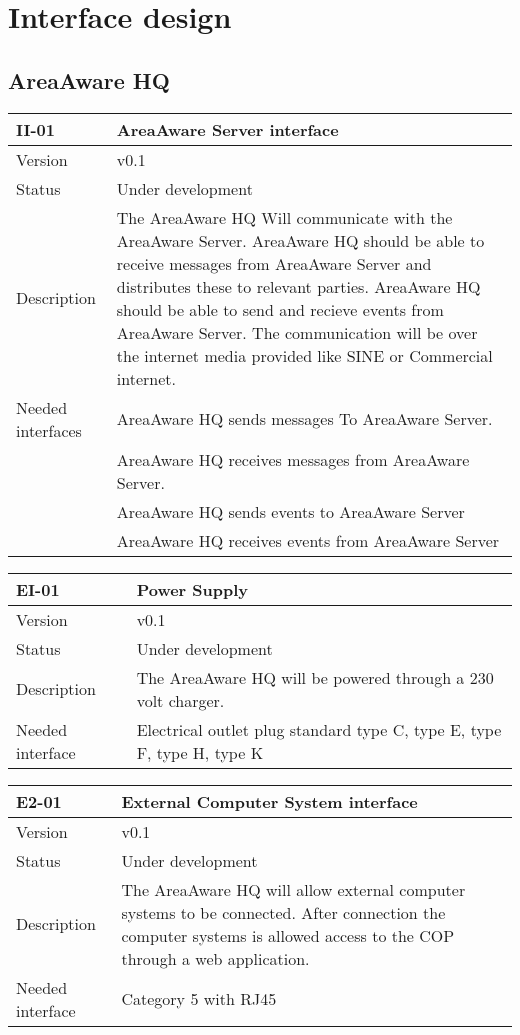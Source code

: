 \chapter{Interface design}
\label{chp_interfaceDesign}

\section{AreaAware HQ}
\label{sec:areaAwarehq}

\begin{longtable}{| p{3.5cm} |  p{10cm} | }
	\hline
	\textbf{II-01} &  \textbf{AreaAware Server interface } \\
	\hline
	Version & v0.1 \\
	\hline
	Status & Under development \\
	\hline
	 Description & The AreaAware HQ Will communicate with the AreaAware Server. AreaAware HQ should be able to receive messages from AreaAware Server and distributes these to relevant parties. AreaAware HQ should be able to send and recieve events from AreaAware Server. The communication will be over the internet media provided like SINE or Commercial internet. 
	  \\
	\hline
	 Needed interfaces & AreaAware HQ sends messages To AreaAware Server.  \\
				& AreaAware HQ receives messages from AreaAware Server. \\
				& AreaAware HQ sends events to AreaAware Server  \\
				& AreaAware HQ receives events from AreaAware Server  \\
	\hline
\end{longtable}

\begin{longtable}{| p{3.5cm} |  p{10cm} | }
	\hline
	\textbf{EI-01} &  \textbf{Power Supply} \\
	\hline
	Version & v0.1 \\
	\hline
	Status & Under development \\
	\hline
	Description & The AreaAware HQ will be powered through a 230 volt charger.	\\
	\hline
	Needed interface &  Electrical outlet plug standard type C, type E,  type F,  type H, type K \\
	\hline
\end{longtable}

\begin{longtable}{| p{3.5cm} |  p{10cm} | }
	\hline
	\textbf{E2-01} &  \textbf{External Computer System interface} \\
	\hline
	Version & v0.1 \\
	\hline
	Status & Under development \\
	\hline
	Description & The AreaAware HQ will allow external computer systems to be connected. After connection the computer systems is allowed access to the COP through a web application.	\\
	\hline
	Needed interface & Category 5 with RJ45 \\
	\hline
\end{longtable}

